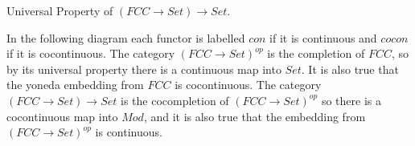 \documentclass[12pt]{article} %
\theoremstyle{definition}
\theoremstyle{definition}
\theoremstyle{definition}
\theoremstyle{definition}
\begin{document}

Universal Property of $(FCC \rightarrow Set) \rightarrow Set$. 

In the following diagram each functor is labelled $con$ if it is continuous and $cocon$ if it is cocontinuous.
The category $(FCC \rightarrow Set)^{op}$ is the completion of $FCC$, so by its universal property there is a continuous
map into $Set$. It is also true that the yoneda embedding from $FCC$ is cocontinuous. The category
$(FCC \rightarrow Set) \rightarrow Set$ is the cocompletion of $(FCC \rightarrow Set)^{op}$ so there is a 
cocontinuous map into $Mod$, and it is also true that the embedding from $(FCC \rightarrow Set)^{op}$ is continuous.
\end{document}
